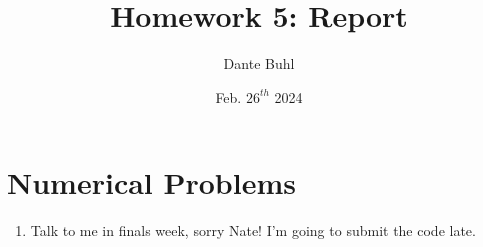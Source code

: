 \documentclass{article}
\title{Homework 5: Report}
\author{Dante Buhl}
\date{Feb. $26^{th}$ 2024}
\begin{document}
\newcommand{\bs}[1]{\boldsymbol{#1}}
\newcommand{\bmp}[1]{\begin{minipage}{#1\textwidth}}
\newcommand{\emp}{\end{minipage}}
\newcommand{\R}{\mathbb{R}}
\newcommand{\C}{\mathbb{C}}
\newcommand{\N}{\mathcal{N}}
\newcommand{\I}{\mathrm{I}}
\newcommand{\K}{\bs{\mathrm{K}}}
\newcommand{\m}{\bs{\mu}_*}
\newcommand{\s}{\bs{\Sigma}_*}
\newcommand{\dt}{\Delta t}
\newcommand{\tr}[1]{\text{Tr}(#1)}
\newcommand{\Tr}[1]{\text{Tr}(#1)}

\maketitle



\section{Numerical Problems}
\begin{enumerate}
    
\item Talk to me in finals week, sorry Nate! I'm going to submit the code late. 
   
\end{enumerate}
\end{document}
